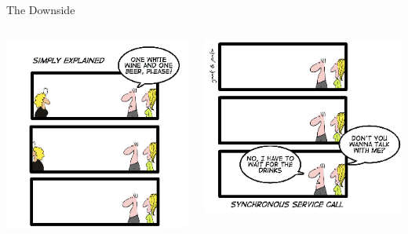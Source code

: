 \documentclass[12pt,xcolor=svgnames]{beamer}
\begin{document}
\begin{frame}{The Downside}
\begin{columns}
\begin{column}[t]{5.5cm}
\includegraphics[width=\textwidth]{images/synccalls1.png}
\end{column}
%
\begin{column}[t]{5.5cm}
\includegraphics[width=\textwidth]{images/synccalls2.png}
\end{column}
\end{columns}
\end{frame}
\end{document}
